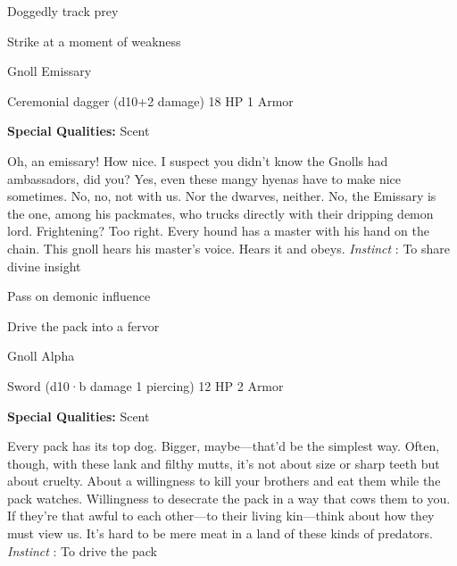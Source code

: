 \startitemize[1,packed]
         
\item Doggedly track prey

         
\item Strike at a moment of weakness

       
\stopitemize
       
\startMonsterName
Gnoll Emissary	 
\stopMonsterName
       

Ceremonial dagger (d10+2 damage)	18 HP	1 Armor

       


       
\startMonsterQualities
         {\bf Special Qualities:}  Scent
\stopMonsterQualities
       
\startMonsterDescription
Oh, an emissary! How nice. I suspect you didn’t know the Gnolls had ambassadors, did you? Yes, even these mangy hyenas have to make nice sometimes. No, no, not with us. Nor the dwarves, neither. No, the Emissary is the one, among his packmates, who trucks directly with their dripping demon lord. Frightening? Too right. Every hound has a master with his hand on the chain. This gnoll hears his master’s voice. Hears it and obeys. {\em Instinct} : To share divine insight
\stopMonsterDescription
       
\startitemize[1,packed]
         
\item Pass on demonic influence

         
\item Drive the pack into a fervor

       
\stopitemize
       
\startMonsterName
Gnoll Alpha	 
\stopMonsterName
       

Sword (d10·b damage 1 piercing)	12 HP	2 Armor

       


       
\startMonsterQualities
         {\bf Special Qualities:}  Scent
\stopMonsterQualities
       
\startMonsterDescription
Every pack has its top dog. Bigger, maybe—that’d be the simplest way. Often, though, with these lank and filthy mutts, it’s not about size or sharp teeth but about cruelty. About a willingness to kill your brothers and eat them while the pack watches. Willingness to desecrate the pack in a way that cows them to you. If they’re that awful to each other—to their living kin—think about how they must view us. It’s hard to be mere meat in a land of these kinds of predators. {\em Instinct} : To drive the pack
\stopMonsterDescription
       

